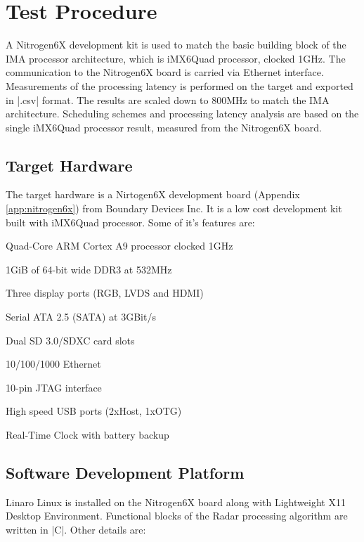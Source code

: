 \section{Test Procedure} 
\label{sec:mm:test_procedure}
A Nitrogen6X development kit is used to match the basic building block of the IMA processor architecture, which is iMX6Quad processor, clocked 1GHz. The communication to the Nitrogen6X board is carried via Ethernet interface. Measurements of the processing latency is performed on the target and exported in \bverb|.csv| format. The results are scaled down to 800MHz to match the IMA architecture. Scheduling schemes and processing latency analysis are based on the single iMX6Quad processor result, measured from the Nitrogen6X board.

\subsection{Target Hardware}
\label{ss:bg_related_work:hw}
The target hardware is a Nirtogen6X development board (Appendix \ref{app:nitrogen6x}) from Boundary Devices Inc. It is a low cost development kit built with iMX6Quad processor. Some of it's features are:
\begin{compactitem} 
	\item Quad-Core ARM Cortex A9 processor clocked 1GHz
	\item 1GiB of 64-bit wide DDR3 at 532MHz
	\item Three display ports (RGB, LVDS and HDMI)
	\item Serial ATA 2.5 (SATA) at 3GBit/s
	\item Dual SD 3.0/SDXC card slots
	\item 10/100/1000 Ethernet
	\item 10-pin JTAG interface
	\item High speed USB ports (2xHost, 1xOTG)
	\item Real-Time Clock with battery backup
\end{compactitem}

\subsection{Software Development Platform}
\label{ss:bg_related_work:sw}
Linaro Linux is installed on the Nitrogen6X board along with Lightweight X11 Desktop Environment. Functional blocks of the Radar processing algorithm are written in \bverb|C|. Other details are:

